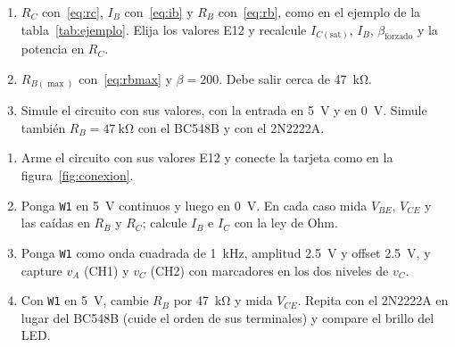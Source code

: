 \documentclass[11pt,a4paper]{article}
\begin{document}
\begin{enumerate}[label=\alph*), leftmargin=*, itemsep=3pt]
  \item $R_C$ con~\eqref{eq:rc}, $I_B$ con~\eqref{eq:ib} y $R_B$ con~\eqref{eq:rb}, como en el
        ejemplo de la tabla~\ref{tab:ejemplo}. Elija los valores E12 y recalcule
        $I_{C(\text{sat})}$, $I_B$, $\beta_{\text{forzado}}$ y la potencia en $R_C$.
  \item $R_{B(\max)}$ con~\eqref{eq:rbmax} y $\beta = 200$. Debe salir cerca de
        \qty{47}{\kilo\ohm}.
  \item Simule el circuito con sus valores, con la entrada en \qty{5}{\volt} y en
        \qty{0}{\volt}. Simule también $R_B = \qty{47}{\kilo\ohm}$ con el BC548B y con el
        2N2222A.
\end{enumerate}

\begin{enumerate}[label=\alph*), ref=\alph*, leftmargin=*, itemsep=3pt]
  \item Arme el circuito con sus valores E12 y conecte la tarjeta como en la
        figura~\ref{fig:conexion}.
  \item Ponga \texttt{W1} en \qty{5}{\volt} continuos y luego en \qty{0}{\volt}. En cada caso
        mida $V_{BE}$, $V_{CE}$ y las caídas en $R_B$ y $R_C$; calcule $I_B$ e $I_C$ con la ley
        de Ohm.
  \item \label{paso:cuadrada}Ponga \texttt{W1} como onda cuadrada de \qty{1}{\kilo\hertz},
        amplitud \qty{2.5}{\volt} y offset \qty{2.5}{\volt}, y capture $v_A$ (CH1) y $v_C$
        (CH2) con marcadores en los dos niveles de $v_C$.
  \item Con \texttt{W1} en \qty{5}{\volt}, cambie $R_B$ por \qty{47}{\kilo\ohm} y mida
        $V_{CE}$. Repita con el 2N2222A en lugar del BC548B (cuide el orden de sus
        terminales) y compare el brillo del LED.
\end{enumerate}
\end{document}
